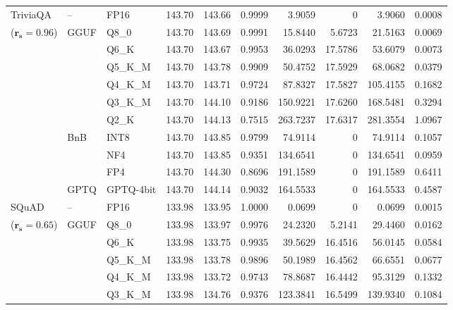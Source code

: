 \begin{longtable}{ll l rrrrrrr}
\midrule
TriviaQA & -- & FP16 & 143.70 & 143.66 & 0.9999 & 3.9059 & \cellcolor{cyan!12} $0$ & 3.9060 & 0.0008 \\
{\small ($\mathbf{r_s{=}0.96}$)} & GGUF & Q8\_0 & 143.70 & 143.69 & 0.9991 & 15.8440 & 5.6723 & 21.5163 & 0.0069 \\
 &  & Q6\_K & 143.70 & 143.67 & 0.9953 & 36.0293 & 17.5786 & 53.6079 & 0.0073 \\
 &  & Q5\_K\_M & 143.70 & 143.78 & 0.9909 & 50.4752 & 17.5929 & 68.0682 & 0.0379 \\
 &  & Q4\_K\_M & 143.70 & 143.71 & 0.9724 & 87.8327 & 17.5827 & 105.4155 & 0.1682 \\
 &  & Q3\_K\_M & 143.70 & 144.10 & \cellcolor{red!18} 0.9186 & \cellcolor{red!18} 150.9221 & 17.6260 & \cellcolor{red!18} 168.5481 & \cellcolor{red!18} 0.3294 \\
 &  & Q2\_K & 143.70 & 144.13 & \cellcolor{red!35} 0.7515 & \cellcolor{red!35} 263.7237 & 17.6317 & \cellcolor{red!35} 281.3554 & \cellcolor{red!35} 1.0967 \\
 & BnB & INT8 & 143.70 & 143.85 & 0.9799 & 74.9114 & \cellcolor{cyan!12} $0$ & 74.9114 & 0.1057 \\
 &  & NF4 & 143.70 & 143.85 & \cellcolor{red!18} 0.9351 & \cellcolor{red!18} 134.6541 & \cellcolor{cyan!12} $0$ & \cellcolor{red!18} 134.6541 & \cellcolor{red!18} 0.0959 \\
 &  & FP4 & 143.70 & 144.30 & \cellcolor{red!18} 0.8696 & \cellcolor{red!18} 191.1589 & \cellcolor{cyan!12} $0$ & \cellcolor{red!18} 191.1589 & \cellcolor{red!18} 0.6411 \\
 & GPTQ & GPTQ-4bit & 143.70 & 144.14 & \cellcolor{red!18} 0.9032 & \cellcolor{red!18} 164.5533 & \cellcolor{cyan!12} $0$ & \cellcolor{red!18} 164.5533 & \cellcolor{red!18} 0.4587 \\
\midrule
SQuAD & -- & FP16 & 133.98 & 133.95 & 1.0000 & 0.0699 & \cellcolor{cyan!12} $0$ & 0.0699 & 0.0015 \\
{\small ($\mathbf{r_s{=}0.65}$)} & GGUF & Q8\_0 & 133.98 & 133.97 & 0.9976 & 24.2320 & 5.2141 & 29.4460 & 0.0162 \\
 &  & Q6\_K & 133.98 & 133.75 & 0.9935 & 39.5629 & 16.4516 & 56.0145 & 0.0584 \\
 &  & Q5\_K\_M & 133.98 & 133.78 & 0.9896 & 50.1989 & 16.4562 & 66.6551 & 0.0677 \\
 &  & Q4\_K\_M & 133.98 & 133.72 & 0.9743 & 78.8687 & 16.4442 & 95.3129 & 0.1332 \\
 &  & Q3\_K\_M & 133.98 & 134.76 & \cellcolor{red!18} 0.9376 & \cellcolor{red!18} 123.3841 & 16.5499 & \cellcolor{red!18} 139.9340 & \cellcolor{red!18} 0.1084 \\

\end{longtable}
